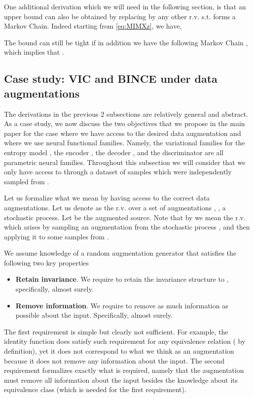 \documentclass[final]{article}
\begin{document}
One additional derivation which we will need in the following section, is that an upper bound can also be obtained by replacing  by any other r.v.  s.t.  forms a Markov Chain. 
Indeed starting from \cref{eq:MIMXz}, we have,

The bound can still be tight if in addition we have the following Markov Chain , which implies that .


\subsection{Case study: VIC and BINCE under data augmentations}
\label{appx:vic_bince}

The derivations in the previous 2 subsections are relatively general and abstract.
As a case study, we now discuss the two objectives that we propose in the main paper for the case where we have access to the desired data augmentation  and where we use neural functional families.
Namely, the variational families for the entropy model , the encoder , the decoder , and the discriminator  are all parametric neural families.
Throughout this subsection we will consider that we only have access to  through a dataset  of samples which were independently sampled from .

Let us formalize what we mean by having access to the correct data augmentations.
Let us denote as  the r.v. over a set of augmentations , \ie, a stochastic process.
Let  be the augmented source.
Note that by  we mean the r.v. which arises by sampling an augmentation  from the stochastic process , and then applying it to some samples  from .
\begin{assumption}[Augmentations]\label{assumption:augmentations}
We assume knowledge of a random augmentation generator  that satisfies the following two key properties
\begin{itemize}
\item \textbf{Retain invariance}. We require  to retain the invariance structure to , specifically,  almost surely.
\item \textbf{Remove information}. We require  to remove as much information as possible about the input. 
Specifically,  almost surely.
\end{itemize}
\end{assumption}
The first requirement is simple but clearly not sufficient.
For example, the identity function does satisfy such requirement for any equivalence relation ( by definition), yet it does not correspond to what we think as an augmentation because it does not remove any information about the input.
The second requirement formalizes exactly what is required, namely that the augmentation must remove all information about the input besides the knowledge about its equivalence class (which is needed for the first requirement).
\end{document}
